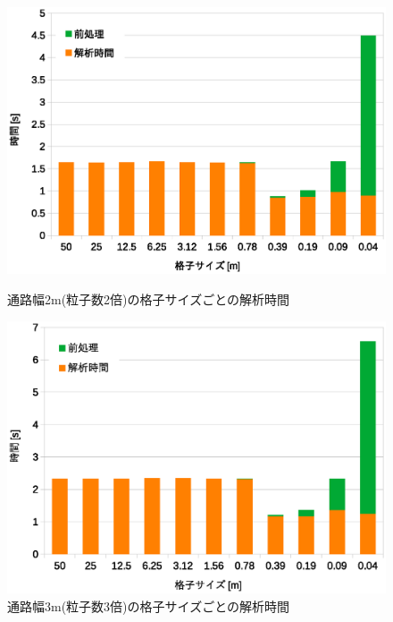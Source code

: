 \begin{figure}[tb]
	\begin{minipage}[b]{0.48\columnwidth}
		\begin{center}
		\includegraphics[width=\columnwidth]{figure/5_2bai_jikan.eps}
		\caption{通路幅2m(粒子数2倍)の格子サイズごとの解析時間}
		\label{fig:result_2bai_jikan}
		\end{center}
	\end{minipage}
	\hspace{0.04\columnwidth}
	\begin{minipage}[b]{0.48\columnwidth}
		\begin{center}
		\includegraphics[width=\columnwidth]{figure/5_3bai_jikan.eps}
		\caption{通路幅3m(粒子数3倍)の格子サイズごとの解析時間}
		\label{fig:result_3bai_times}
		\end{center}
	\end{minipage}
\end{figure}



